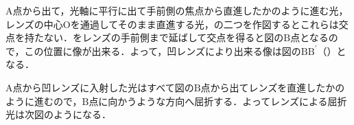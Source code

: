 \begin{reidaiunit}
\begin{kaitou}
\begin{komon}
 $\mathrm{A}$点から出て，光軸に平行に出て手前側の焦点から直進したかのように進む光，レンズの中心$\mathrm{O}$を通過してそのまま直進する光，の二つを作図するとこれらは交点を持たない．をレンズの手前側まで延ばして交点を得ると図の$\mathrm{B}$点となるので，この位置に像が出来る．よって，凹レンズにより出来る像は図の$\mathrm{BB^\prime}$（）となる．
       \begin{center}\end{center}
 $\mathrm{A}$点から凹レンズに入射した光はすべて図の$\mathrm{B}$点から出てレンズを直進したかのように進むので，$\mathrm{B}$点に向かうような方向へ屈折する．よってレンズによる屈折光は次図のようになる．
       \begin{center}\end{center}
\end{komon}
\end{kaitou}
\end{reidaiunit}

